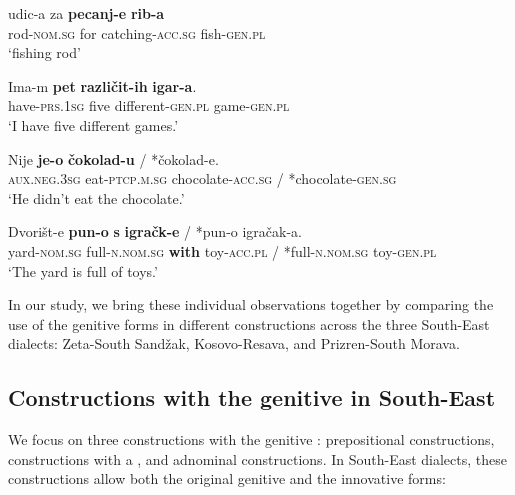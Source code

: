 \documentclass[output=paper,colorlinks,citecolor=brown]{langscibook}
\begin{document}
\begin{exe}
	\ex
	\begin{xlist}
		
		\ex \label{05ex5a}
		\gll udic-a za \textbf{pecanj-e} \textbf{rib-a} \\
		rod-\textsc{nom.sg} for catching-\textsc{acc.sg} fish-\textsc{gen.pl} \\
		\trans ‘fishing rod’
		
		\ex \label{05ex5b}
		\gll Ima-m \textbf{pet} \textbf{različit-ih} \textbf{igar-a}. \\
		have-\textsc{prs.1sg} five different-\textsc{gen.pl} game-\textsc{gen.pl} \\
		\trans ‘I have five different games.’
		
		\ex \label{05ex5c}
		\gll Nije \textbf{je-o} \textbf{čokolad-u} / *čokolad-e. \\
		\textsc{aux.neg.3sg} eat-\textsc{ptcp.m.sg} chocolate-\textsc{acc.sg} / *chocolate-\textsc{gen.sg} \\
		\trans ‘He didn’t eat the chocolate.’
		
		\ex \label{05ex5d}
		\gll Dvorišt-e \textbf{pun-o} \textbf{s} \textbf{igračk-e} / *pun-o igračak-a. \\
		yard-\textsc{nom.sg} full-\textsc{n.nom.sg} \textbf{with} toy-\textsc{acc.pl} / *full-\textsc{n.nom.sg} toy-\textsc{gen.pl} \\
		\trans ‘The yard is full of toys.’
	\end{xlist}
\end{exe}

In our study, we bring these individual observations together by comparing the use of the genitive  forms in different constructions across the three South-East  dialects: Zeta-South Sandžak, Kosovo-Resava, and Prizren-South Morava.

\subsection{Constructions with the genitive in South-East } \label{05sec3.3}

We focus on three constructions with the genitive : prepositional constructions, constructions with a , and adnominal constructions. In South-East  dialects, these constructions allow both the original genitive and the innovative  forms:
\end{document}
